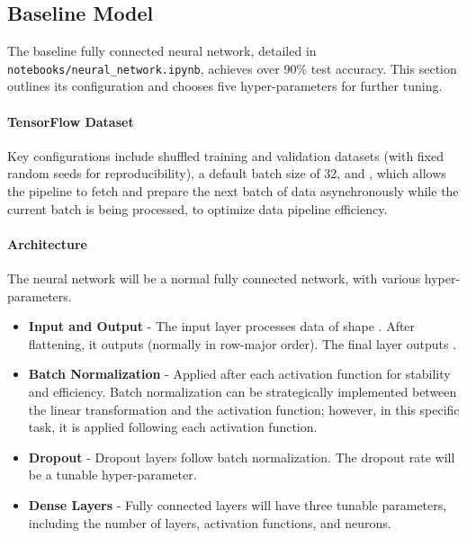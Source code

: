 \documentclass{article}
\begin{document}
\subsection{Baseline Model}
\label{sec:baseline}

The baseline fully connected neural network, detailed in \texttt{notebooks/neural\_network.ipynb}, achieves over 90\% test accuracy. This section outlines its configuration and chooses five hyper-parameters for further tuning.

\paragraph{TensorFlow Dataset} 
Key configurations include shuffled training and validation datasets (with fixed random seeds for reproducibility), a default batch size of 32, and , which allows the pipeline to fetch and prepare the next batch of data asynchronously while the current batch is being processed, to optimize data pipeline efficiency.

\paragraph{Architecture} The neural network will be a normal fully connected network, with various hyper-parameters.
\begin{itemize}
    \item \textbf{Input and Output} - The input layer processes data of shape . After flattening, it outputs  (normally in row-major order). The final layer outputs .
    \item \textbf{Batch Normalization} - Applied after each activation function for stability and efficiency. Batch normalization can be strategically implemented between the linear transformation and the activation function; however, in this specific task, it is applied following each activation function.
    \item \textbf{Dropout} - Dropout layers follow batch normalization. The dropout rate will be a tunable hyper-parameter.
    \item \textbf{Dense Layers} - Fully connected layers will have three tunable parameters, including the number of layers, activation functions, and neurons.
\end{itemize}
\end{document}

